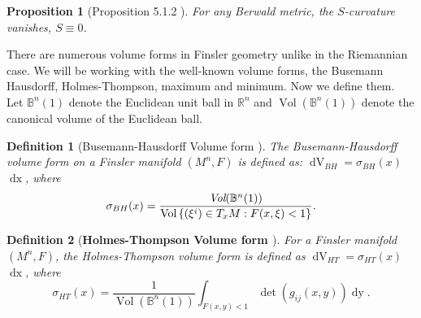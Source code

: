 \documentclass[pdflatex,sn-mathphys-num]{sn-jnl}%
\theoremstyle{thmstyleone}%
\newtheorem{proposition}[theorem]{Proposition}%
\theoremstyle{thmstyletwo}%
\theoremstyle{thmstylethree}%
\newtheorem{definition}{Definition}%
\begin{document}
\vspace{0.15in}	

\begin{proposition}[Proposition 5.1.2 \textbf{\cite[\boldmath p. $90$]{VCRFG}}]
    For any Berwald metric, the $S$-curvature vanishes, $S \equiv 0$.
\end{proposition}

\vspace{0.15in}	

  There are numerous volume forms in Finsler geometry
 unlike in the Riemannian case. We will be working with the well-known volume forms, the Busemann Hausdorff, Holmes-Thompson, maximum and minimum. Now we define them.\\
 
Let $\mathbb{B}^n(1)$ denote the Euclidean unit ball in $\mathbb{R}^n$ and  ${\operatorname{Vol}(\mathbb{B}^n(1))}$  denote the canonical volume of the Euclidean ball.


 
\begin{definition}[{Busemann-Hausdorff Volume form \cite[\boldmath p. $22$]{SSZ}}]
 The \textit{Busemann-Hausdorff} volume form on a Finsler manifold $(M^n,F)$ is defined as:
  $\operatorname{dV}_{BH}=\sigma_{BH}(x)$ $\operatorname{dx}$, where
 \begin{equation}
 \sigma_{BH}(x)=\frac{\emph{Vol} (\mathbb{B}^n(1))}{\textnormal{Vol} \left\lbrace (\xi^i)\in T_xM: F(x,\xi)<1\right\rbrace}.
 \end{equation}
 \end{definition}
 
\vspace{0.15in}	
	
\begin{definition}
[\textbf{Holmes-Thompson Volume form \cite[\boldmath p. $6$]{sc}}] 
For a Finsler manifold $(M^n,F)$, the {\it Holmes-Thompson} volume form is defined as $\operatorname{dV}_{HT}=\sigma_{HT}(x)$ $\operatorname{dx}$, where 
            \begin{equation}\label{2.02}
				\sigma_{HT}(x)=\frac{1}{\operatorname{Vol}({\mathbb{B}}^n(1))}\int_{F(x,y)<1}\det(g_{ij}(x,y))\operatorname{dy}.
			\end{equation}
\end{definition}

   \vspace{0.15in}	
   
\end{document}
